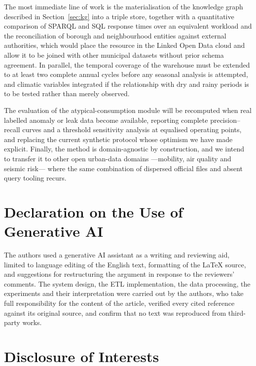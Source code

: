\documentclass[runningheads]{llncs}
\renewcommand{\_}{\origunderscore\allowbreak}
\newif\ifshowchanges
\newcommand{\new}[1]{\ifshowchanges\textcolor{chg}{#1}\else#1\fi}
\newenvironment{chgblock}{\ifshowchanges\color{chg}\fi}{}
\begin{document}
\new{The most immediate line of work is the materialisation of the knowledge
graph described in Section~\ref{sec:kg} into a triple store, together with a
quantitative comparison of SPARQL and SQL response times over an equivalent
workload and the reconciliation of borough and neighbourhood entities against
external authorities, which would place the resource in the Linked Open Data
cloud and allow it to be joined with other municipal datasets without prior
schema agreement. In parallel, the temporal coverage of the warehouse must be
extended to at least two complete annual cycles before any seasonal analysis is
attempted, and climatic variables integrated if the relationship with dry and
rainy periods is to be tested rather than merely observed.}

\new{The evaluation of the atypical-consumption module will be recomputed when
real labelled anomaly or leak data become available, reporting complete
precision--recall curves and a threshold sensitivity analysis at equalised
operating points, and replacing the current synthetic protocol whose optimism we
have made explicit. Finally, the method is domain-agnostic by construction, and
we intend to transfer it to other open urban-data domains ---mobility, air
quality and seismic risk--- where the same combination of dispersed official
files and absent query tooling recurs.}

\begin{chgblock}
\section*{Declaration on the Use of Generative AI}

The authors used a generative AI assistant as a writing and reviewing aid,
limited to language editing of the English text, formatting of the
\LaTeX{} source, and suggestions for restructuring the argument in response to
the reviewers' comments. The system design, the ETL implementation, the data
processing, the experiments and their interpretation were carried out by the
authors, who take full responsibility for the content of the article, verified
every cited reference against its original source, and confirm that no text was
reproduced from third-party works.
\end{chgblock}

\section*{Disclosure of Interests}
\end{document}
